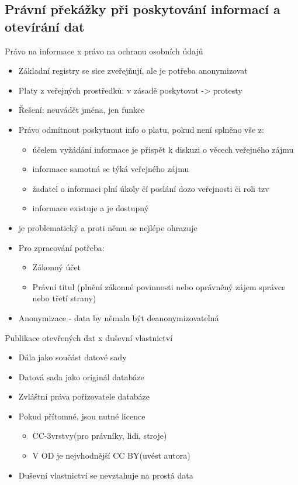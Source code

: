 \subsection{Právní překážky při poskytování informací a otevírání dat}
Právo na informace x právo na ochranu osobních údajů
\begin{itemize}
      \item Základní registry se sice zveřejňují, ale je potřeba anonymizovat
      \item Platy z veřejných prostředků: v zásadě poskytovat -> protesty
      \item Řešení: neuvádět jména, jen funkce
      \item Právo odmítnout poskytnout info o platu, pokud není splněno vše z:
            \begin{itemize}
                  \item účelem vyžádání informace je přispět k diskuzi o věcech veřejného zájmu
                  \item informace samotná se týká veřejného zájmu
                  \item žadatel o informaci plní úkoly čí poslání dozo veřejnosti či roli tzv 
                  \item informace existuje a je dostupný
            \end{itemize}
      \item {} je problematický a proti němu se nejlépe ohrazuje
      \item Pro zpracování potřeba:
            \begin{itemize}
                  \item  Zákonný účet
                  \item Právní titul (plnění zákonné povinnosti nebo oprávněný zájem správce nebo třetí
                        strany)
            \end{itemize}
      \item Anonymizace - data by němala být deanonymizovatelná
\end{itemize}
Publikace otevřených dat x duševní vlastnictví
\begin{itemize}
      \item Dála jako součást datové sady
      \item Datová sada jako originál databáze
      \item Zvláštní práva pořizovatele databáze
      \item Pokud přítomné, jsou nutné licence
            \begin{itemize}
                  \item CC-3vrstvy(pro právníky, lidi, stroje)
                  \item V OD je nejvhodnější CC BY(uvést autora)
            \end{itemize}
      \item Duševní vlastnictví se nevztahuje na prostá data
\end{itemize}

